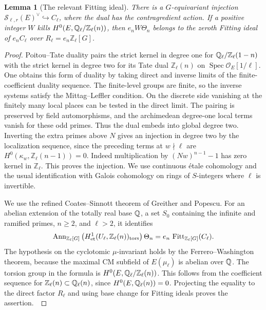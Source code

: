 \documentclass[a4paper,11pt]{article}
\newtheorem{lemma}[proposition]{Lemma}
\theoremstyle{definition}
\theoremstyle{remark}
\newcommand{\ZZ}{\mathbb Z}\newcommand{\ord}{\operatorname{ord}}
\numberwithin{equation}{section}
\begin{document}
\begin{lemma}[The relevant Fitting ideal]\label{lem:fit13}
There is a \(G\)-equivariant injection \(\mathcal S_{\ell,r}(E)^\vee\hookrightarrow C_\ell\), where the dual has the contragredient action. If a positive integer \(W\) kills \(H^0(E,\QQ_\ell/\ZZ_\ell(n))\), then \(e_nW\Theta_n\) belongs to the zeroth Fitting ideal of \(e_n C_\ell\) over \(R_\ell=e_n\ZZ_\ell[G]\).
\end{lemma}
\begin{proof}
Poitou--Tate duality pairs the strict kernel in degree one for \(\QQ_\ell/\ZZ_\ell(1-n)\) with the strict kernel in degree two for its Tate dual \(\ZZ_\ell(n)\) on \(\operatorname{Spec}\mathcal O_E[1/\ell]\). One obtains this form of duality by taking direct and inverse limits of the finite-coefficient duality sequence. The finite-level groups are finite, so the inverse systems satisfy the Mittag--Leffler condition. On the discrete side vanishing at the finitely many local places can be tested in the direct limit. The pairing is preserved by field automorphisms, and the archimedean degree-one local terms vanish for these odd primes. Thus the dual embeds into global degree two. Inverting the extra primes above \(N\) gives an injection in degree two by the localization sequence, since the preceding terms at \(w\nmid\ell\) are \(H^0(\kappa_w,\ZZ_\ell(n-1))=0\). Indeed multiplication by \((Nw)^{n-1}-1\) has zero kernel in \(\ZZ_\ell\). This proves the injection. We use continuous étale cohomology and the usual identification with Galois cohomology on rings of \(S\)-integers where \(\ell\) is invertible.~\cite{II-II-II-duality13,II-II-II-gp13}

We use the refined Coates--Sinnott theorem of Greither and Popescu. For an abelian extension of the totally real base \(\mathbb Q\), a set \(S_0\) containing the infinite and ramified primes, \(n\ge2\), and \(\ell>2\), it identifies
\[
 \operatorname{Ann}_{\ZZ_\ell[G]}
    \big(H^1_{\rm et}(U_\ell,\ZZ_\ell(n))_{\rm tors}\big)\,\Theta_n
       = e_n\,\operatorname{Fitt}_{\ZZ_\ell[G]}(C_\ell).
\]
The hypothesis on the cyclotomic \(\mu\)-invariant holds by the Ferrero--Washington theorem, because the maximal CM subfield of \(E(\mu_\ell)\) is abelian over \(\mathbb Q\). The torsion group in the formula is \(H^0(E,\QQ_\ell/\ZZ_\ell(n))\). This follows from the coefficient sequence for \(\ZZ_\ell(n)\subset\QQ_\ell(n)\), since \(H^0(E,\mathbb Q_\ell(n))=0\). Projecting the equality to the direct factor \(R_\ell\) and using base change for Fitting ideals proves the assertion.~\cite[Thm.~6.11 and Lem.~6.9]{II-II-II-gp13}\cite{II-II-II-fw13}
\end{proof}
\end{document}
